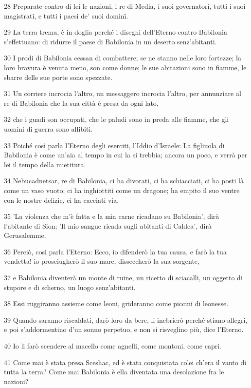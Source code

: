 \par 28 Preparate contro di lei le nazioni, i re di Media, i suoi governatori, tutti i suoi magistrati, e tutti i paesi de' suoi dominî.
\par 29 La terra trema, è in doglia perché i disegni dell'Eterno contro Babilonia s'effettuano: di ridurre il paese di Babilonia in un deserto senz'abitanti.
\par 30 I prodi di Babilonia cessan di combattere; se ne stanno nelle loro fortezze; la loro bravura è venuta meno, son come donne; le sue abitazioni sono in fiamme, le sbarre delle sue porte sono spezzate.
\par 31 Un corriere incrocia l'altro, un messaggero incrocia l'altro, per annunziare al re di Babilonia che la sua città è presa da ogni lato,
\par 32 che i guadi son occupati, che le paludi sono in preda alle fiamme, che gli uomini di guerra sono allibiti.
\par 33 Poiché così parla l'Eterno degli eserciti, l'Iddio d'Israele: La figliuola di Babilonia è come un'aia al tempo in cui la si trebbia; ancora un poco, e verrà per lei il tempo della mietitura.
\par 34 Nebucadnetsar, re di Babilonia, ci ha divorati, ci ha schiacciati, ci ha posti là come un vaso vuoto; ci ha inghiottiti come un dragone; ha empito il suo ventre con le nostre delizie, ci ha cacciati via.
\par 35 'La violenza che m'è fatta e la mia carne ricadano su Babilonia', dirà l'abitante di Sion; 'Il mio sangue ricada sugli abitanti di Caldea', dirà Gerusalemme.
\par 36 Perciò, così parla l'Eterno: Ecco, io difenderò la tua causa, e farò la tua vendetta! io prosciugherò il suo mare, disseccherò la sua sorgente,
\par 37 e Babilonia diventerà un monte di ruine, un ricetto di sciacalli, un oggetto di stupore e di scherno, un luogo senz'abitanti.
\par 38 Essi ruggiranno assieme come leoni, grideranno come piccini di leonesse.
\par 39 Quando saranno riscaldati, darò loro da bere, li inebrierò perché stiano allegri, e poi s'addormentino d'un sonno perpetuo, e non si risveglino più, dice l'Eterno.
\par 40 Io li farò scendere al macello come agnelli, come montoni, come capri.
\par 41 Come mai è stata presa Sceshac, ed è stata conquistata colei ch'era il vanto di tutta la terra? Come mai Babilonia è ella diventata una desolazione fra le nazioni?
